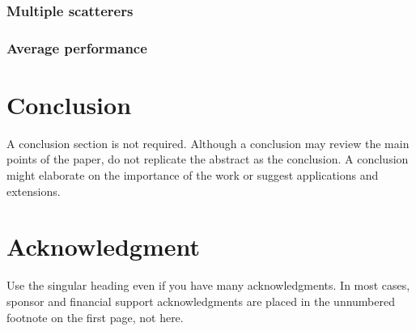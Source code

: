 \documentclass{IEEEtran}
\begin{document}
			\subsubsection{Multiple scatterers}\label{sec:results:position:multiple}
			
			\subsubsection{Average performance}\label{sec:results:position:benchmark}
    
    \section{Conclusion}\label{sec:conclusion}
        A conclusion section is not required. Although a conclusion may review the main points of the paper, do not replicate the abstract as the conclusion. A  conclusion might elaborate on the importance of the work or suggest applications and extensions. \cite{chen2018computational}
    
    \appendices
    
    \section*{Acknowledgment}
    
        Use the singular heading even if you have many acknowledgments. In most  cases, sponsor and financial support acknowledgments are placed in the  unnumbered footnote on the first page, not here.
    
    
    
    
        
\end{document}
